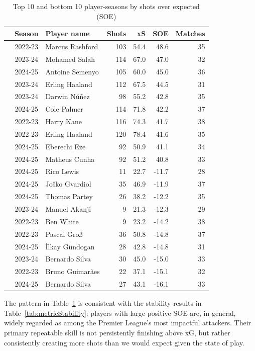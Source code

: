 \documentclass[12pt,letterpaper]{article}
\begin{document}
\begin{table}[h]
\centering
\caption{Top 10 and bottom 10 player-seasons by shots over expected (SOE)}
\label{tab:xsoe-summary}
\begin{tabular}{l c l r r r r}
\toprule
 & \textbf{Season} & \textbf{Player name} & \textbf{Shots} & \textbf{xS} & \textbf{SOE} & \textbf{Matches} \\
\midrule
 & 2022-23 & Marcus Rashford   & 103 & 54.4 & 48.6  & 35 \\
 & 2023-24 & Mohamed Salah     & 114 & 67.0 & 47.0  & 32 \\
 & 2024-25 & Antoine Semenyo   & 105 & 60.0 & 45.0  & 36 \\
 & 2023-24 & Erling Haaland    & 112 & 67.5 & 44.5  & 31 \\
 & 2023-24 & Darwin Núñez      & 98  & 55.2 & 42.8  & 35 \\
 & 2024-25 & Cole Palmer       & 114 & 71.8 & 42.2  & 37 \\
 & 2022-23 & Harry Kane        & 116 & 74.3 & 41.7  & 38 \\
 & 2022-23 & Erling Haaland    & 120 & 78.4 & 41.6  & 35 \\
 & 2024-25 & Eberechi Eze      & 92  & 50.9 & 41.1  & 34 \\
 & 2024-25 & Matheus Cunha     & 92  & 51.2 & 40.8  & 33 \\
\midrule
 & 2024-25 & Rico Lewis        & 11  & 22.7 & -11.7 & 28 \\
 & 2024-25 & Joško Gvardiol    & 35  & 46.9 & -11.9 & 37 \\
 & 2024-25 & Thomas Partey     & 26  & 38.2 & -12.2 & 35 \\
 & 2023-24 & Manuel Akanji     & 9   & 21.3 & -12.3 & 29 \\
 & 2022-23 & Ben White         & 9   & 23.2 & -14.2 & 38 \\
 & 2022-23 & Pascal Gro\ss     & 36  & 50.8 & -14.8 & 37 \\
 & 2024-25 & İlkay Gündogan    & 28  & 42.8 & -14.8 & 31 \\
 & 2023-24 & Bernardo Silva    & 30  & 45.0 & -15.0 & 33 \\
 & 2022-23 & Bruno Guimarães   & 22  & 37.1 & -15.1 & 32 \\
 & 2024-25 & Bernardo Silva    & 27  & 43.1 & -16.1 & 33 \\
\bottomrule
\end{tabular}
\end{table}

The pattern in Table~\ref{tab:xsoe-summary} is consistent with the stability results in Table~\ref{tab:metricStability}: players with large positive SOE are, in general, widely regarded as among the Premier League's most impactful attackers. Their primary repeatable skill is not persistently finishing above xG, but rather consistently creating more shots than we would expect given the state of play.
\end{document}
